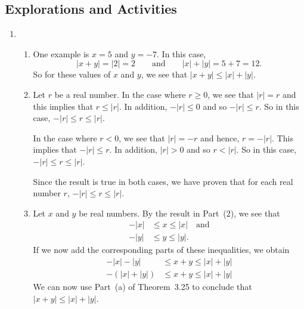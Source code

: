 \subsection*{Explorations and Activities}
\setcounter{oldenumi}{\theenumi}
\begin{enumerate} \setcounter{enumi}{\theoldenumi}
\item \begin{enumerate}
\item One example is $x = 5$ and $y = -7$.  In this case, 
\[
\left| x + y \right| = \left| 2 \right| = 2 \qquad \text{and} \qquad \left| x \right| + \left| y \right| = 5 + 7 = 12.
\]
So for these values of $x$ and $y$, we see that 
$\left| x + y \right| \leq \left| x \right| + \left| y \right|$.

\item Let $r$ be a real number. In the case where $r \geq 0$, we see that $\left| r \right| = r$ and this implies that $r \leq \left| r \right|$. In addition, $-\left| r \right| \leq 0$ and so 
$-\left| r \right| \leq r$.  So in this case, $-\left| r \right| \leq r \leq \left| r \right|$.

In the case where $r < 0$, we see that $\left| r \right| = -r$ and hence, 
$r = -\left| r \right|$.  This implies that 
$-\left| r \right| \leq r$. In addition, $\left| r \right| > 0$ and so 
$r < \left| r \right|$.  So in this case, $-\left| r \right| \leq r \leq \left| r \right|$.

Since the result is true in both cases, we have proven that for each real number $r$, 
$-\left| r \right| \leq r \leq \left| r \right|$.

\item Let $x$ and $y$ be real numbers.  By the result in Part~(2), we see that
\begin{align*}
-\left| x \right| &\leq x \leq \left| x \right| \quad \text{and} \\
-\left| y \right| &\leq y \leq \left| y \right|.
\end{align*}
If we now add the corresponding parts of these inequalities, we obtain
\begin{align*}
-\left| x \right| - \left| y \right| &\leq x + y \leq \left| x \right| + \left| y \right| \\
-\left( \left| x \right| + \left| y \right| \right) &\leq x + y \leq \left| x \right| + \left| y \right|
\end{align*}
We can now use Part~(a) of Theorem~3.25 to conclude that 
$\left| x + y \right| \leq \left| x \right| + \left| y \right|$.
\end{enumerate}

\end{enumerate}

\hbreak

\endinput
